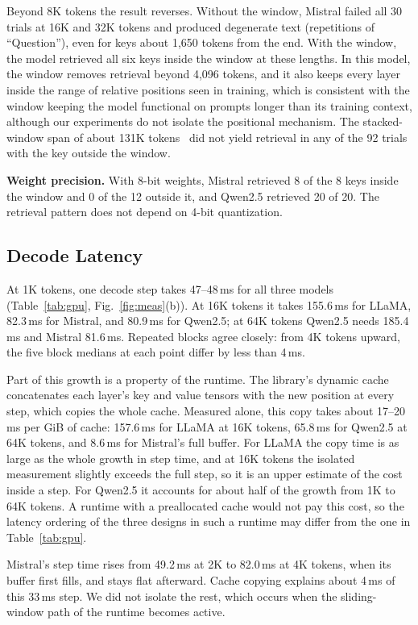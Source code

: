 \documentclass[conference]{IEEEtran}
\begin{document}
Beyond 8K tokens the result reverses. Without the window, Mistral failed all 30 trials at 16K and 32K tokens and produced degenerate text (repetitions of ``Question''), even for keys about 1,650 tokens from the end. With the window, the model retrieved all six keys inside the window at these lengths. In this model, the window removes retrieval beyond 4,096 tokens, and it also keeps every layer inside the range of relative positions seen in training, which is consistent with the window keeping the model functional on prompts longer than its training context, although our experiments do not isolate the positional mechanism. The stacked-window span of about 131K tokens~\cite{mistral} did not yield retrieval in any of the 92 trials with the key outside the window.

\textbf{Weight precision.} With 8-bit weights, Mistral retrieved 8 of the 8 keys inside the window and 0 of the 12 outside it, and Qwen2.5 retrieved 20 of 20. The retrieval pattern does not depend on 4-bit quantization.

\subsection{Decode Latency}
At 1K tokens, one decode step takes 47--48\,ms for all three models (Table~\ref{tab:gpu}, Fig.~\ref{fig:meas}(b)). At 16K tokens it takes 155.6\,ms for LLaMA, 82.3\,ms for Mistral, and 80.9\,ms for Qwen2.5; at 64K tokens Qwen2.5 needs 185.4\,ms and Mistral 81.6\,ms. Repeated blocks agree closely: from 4K tokens upward, the five block medians at each point differ by less than 4\,ms.

Part of this growth is a property of the runtime. The library's dynamic cache concatenates each layer's key and value tensors with the new position at every step, which copies the whole cache. Measured alone, this copy takes about 17--20 ms per GiB of cache: 157.6\,ms for LLaMA at 16K tokens, 65.8\,ms for Qwen2.5 at 64K tokens, and 8.6\,ms for Mistral's full buffer. For LLaMA the copy time is as large as the whole growth in step time, and at 16K tokens the isolated measurement slightly exceeds the full step, so it is an upper estimate of the cost inside a step. For Qwen2.5 it accounts for about half of the growth from 1K to 64K tokens. A runtime with a preallocated cache would not pay this cost, so the latency ordering of the three designs in such a runtime may differ from the one in Table~\ref{tab:gpu}.

Mistral's step time rises from 49.2\,ms at 2K to 82.0\,ms at 4K tokens, when its buffer first fills, and stays flat afterward. Cache copying explains about 4\,ms of this 33\,ms step. We did not isolate the rest, which occurs when the sliding-window path of the runtime becomes active.
\end{document}
